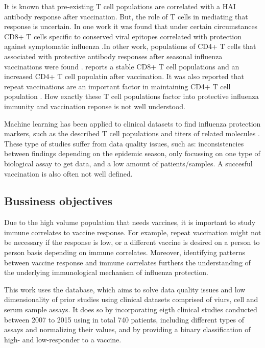 It is known that pre-existing T cell populations are correlated with a HAI
antibody response after vaccination. But, the role of T cells in mediating that
response is uncertain. In one work it was found that under certain
circumstances CD8+ T cells specific to conserved viral epitopes correlated with
protection against symptomatic influenza
\citep{sridharCellularImmuneCorrelates2013}.In other work, populations of CD4+
T cells that associated with protective antibody responses after seasonal
influenza vaccinations were found \citep{bentebibelInductionICOSCXCR3}.
\cite{trieuLongtermMaintenanceInfluenzaSpecific2017} reports a stable CD8+ T
cell populations and an increased CD4+ T cell populatin after vaccination. It was
also reported that repeat vaccinations are an important factor in maintaining
CD4+ T cell population \citep{trieuLongtermMaintenanceInfluenzaSpecific2017}.
How exactly these T cell populations factor into protective influenza immunity
and vaccination reponse is not well understood.

Machine learning has been applied to clinical datasets to find influenza
protection markers, such as the described T cell populations and titers of
related molecules \citep{furmanApoptosisOtherImmune2013,
sobolevAdjuvantedInfluenzaH1N1Vaccination2016, tsangGlobalAnalysesHuman2014}.
These type of studies suffer from data quality issues, such as: inconsistencies
between findings depending on the epidemic season, only focussing on one type
of biological assay to get data, and a low amount of patients/samples. A
succesful vaccination is also often not well defined.

\subsection{Bussiness objectives}

Due to the high volume population that needs vaccines, it is important to study
immune correlates to vaccine response. For example, repeat vaccination might
not be necessary if the response is low, or a different vaccine is desired on a
person to person basis depending on immune correlates. Moreover, identifying
patterns between vaccine response and immune correlates furthers the
understanding of the underlying immunological mechanism of influenza
protection.

This work uses the \flup database, which aims to solve data quality issues
and low dimensionality of prior studies using clinical datasets comprised of
viurs, cell and serum sample assays. It does so by incorporating eigth clinical
studies conducted between 2007 to 2015 using in total 740 patients, including
different types of assays and normalizing their values, and by providing a
binary classification of high- and low-responder to a vaccine.

